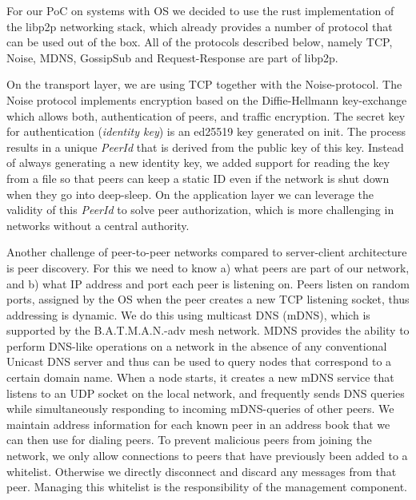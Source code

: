For our PoC on systems with OS we decided to use the rust implementation of the libp2p networking stack, which already provides a number of protocol that can be used out of the box. 
All of the protocols described below, namely TCP, Noise, MDNS, GossipSub and Request-Response are part of libp2p.

On the transport layer, we are using TCP together with the Noise-protocol. 
The Noise protocol implements encryption based on the Diffie-Hellmann key-exchange which allows both, authentication of peers, and traffic encryption. 
The secret key for authentication (\textit{identity key}) is an ed25519 key generated on init.
The process results in a unique \textit{PeerId} that is derived from the public key of this key. 
Instead of always generating a new identity key, we added support for  reading the key from a file so that peers can keep a static ID even if the network is shut down when they go into deep-sleep.
On the application layer we can leverage the validity of this \textit{PeerId} to solve peer authorization, which is more challenging in networks without a central authority.

Another challenge of peer-to-peer networks compared to server-client architecture is peer discovery.
For this we need to know a) what peers are part of our network, and b) what IP address and port each peer is listening on. 
Peers listen on random ports, assigned by the OS when the peer creates a new TCP listening socket, thus addressing is dynamic. 
We do this using multicast DNS (mDNS), which is supported by the B.A.T.M.A.N.-adv mesh network.
MDNS provides the ability to perform DNS-like operations on a network in the absence of any conventional Unicast DNS server and thus can be used to query nodes that correspond to a certain domain name.
When a node starts, it creates a new mDNS service that listens to an UDP socket on the local network, and frequently sends DNS queries while simultaneously responding to incoming mDNS-queries of other peers.
We maintain address information for each known peer in an address book that we can then use for dialing peers. 
To prevent malicious peers from joining the network, we only allow connections to peers that have previously been added to a whitelist. 
Otherwise we directly disconnect and discard any messages from that peer.
Managing this whitelist is the responsibility of the management component. 

